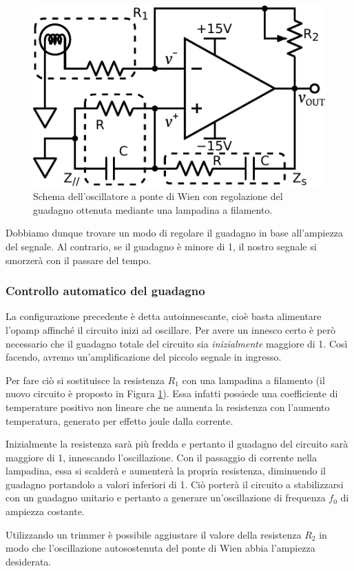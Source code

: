 \begin{figure}
\centering
\includegraphics[width=.35\textwidth]{../E08/latex/osc_w_lamp.pdf}
\caption{Schema dell'oscillatore a ponte di Wien con regolazione del guadagno ottenuta mediante una lampadina a filamento.}
\label{cir8:with_lamp}
\end{figure}

Dobbiamo dunque trovare un modo di regolare il guadagno in base all'ampiezza del segnale.
Al contrario, se il guadagno è minore di 1, il nostro segnale si smorzerà con il passare del tempo.

\subsubsection*{Controllo automatico del guadagno}

La configurazione precedente è detta autoinnescante, cioè basta alimentare l'opamp affinché il circuito inizi ad oscillare.
Per avere un innesco certo è però necessario che il guadagno totale del circuito sia \textit{inizialmente} maggiore di \num{1}. Così facendo, avremo un'amplificazione del piccolo segnale in ingresso.

Per fare ciò si sostituisce la resistenza $R_1$ con una lampadina a filamento (il nuovo circuito è proposto in Figura \ref{cir8:with_lamp}).
Essa infatti possiede una coefficiente di temperature positivo non lineare che ne aumenta la resistenza con l'aumento temperatura, generato per effetto joule dalla corrente.

Inizialmente la resistenza sarà più fredda e pertanto il guadagno del circuito sarà maggiore di \num{1}, innescando l'oscillazione.
Con il passaggio di corrente nella lampadina, essa si scalderà e aumenterà la propria resistenza, diminuendo il guadagno portandolo a valori inferiori di \num{1}.
Ciò porterà il circuito a stabilizzarsi con un guadagno unitario e pertanto a generare un'oscillazione di frequenza $f_0$ di ampiezza costante.

Utilizzando un trimmer è possibile aggiustare il valore della resistenza $R_2$ in modo che l'oscillazione autosostenuta del ponte di Wien abbia l'ampiezza desiderata.


